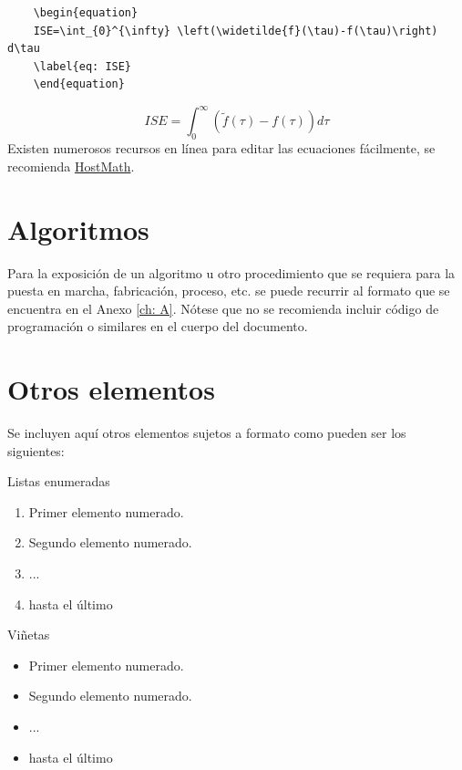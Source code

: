 \begin{lstlisting}
	\begin{equation}
	ISE=\int_{0}^{\infty} \left(\widetilde{f}(\tau)-f(\tau)\right) d\tau
	\label{eq: ISE}
	\end{equation}
\end{lstlisting}
\begin{equation}
	ISE=\int_{0}^{\infty} \left(\widetilde{f}(\tau)-f(\tau)\right) d\tau
	\label{eq: ISE}
\end{equation}
Existen numerosos recursos en línea para editar las ecuaciones fácilmente, se recomienda \href{http://www.hostmath.com/}{HostMath}.

\section{Algoritmos}
Para la exposición de un algoritmo u otro procedimiento que se requiera para la puesta en marcha, fabricación, proceso, etc. se puede recurrir al formato que se encuentra en el Anexo \ref{ch: A}. Nótese que no se recomienda incluir código de programación o similares en el cuerpo del documento.
\section{Otros elementos}
Se incluyen aquí otros elementos sujetos a formato como pueden ser los siguientes:


Listas enumeradas
\begin{enumerate}
	\item Primer elemento numerado.
	\item Segundo elemento numerado.
	\item ...
	\item hasta el último
\end{enumerate} 

Viñetas
\begin{itemize}
	\item Primer elemento numerado.
	\item Segundo elemento numerado.
	\item ...
	\item hasta el último
\end{itemize}

